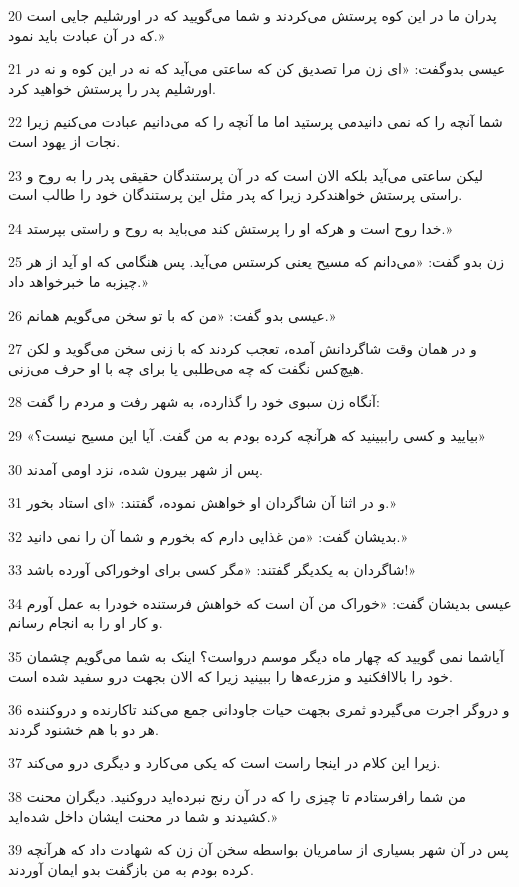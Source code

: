 \par 20 پدران ما در این کوه پرستش می‌کردند و شما می‌گویید که در اورشلیم جایی است که در آن عبادت باید نمود.»
\par 21 عیسی بدوگفت: «ای زن مرا تصدیق کن که ساعتی می‌آید که نه در این کوه و نه در اورشلیم پدر را پرستش خواهید کرد.
\par 22 شما آنچه را که نمی دانیدمی پرستید اما ما آنچه را که می‌دانیم عبادت می‌کنیم زیرا نجات از یهود است.
\par 23 لیکن ساعتی می‌آید بلکه الان است که در آن پرستندگان حقیقی پدر را به روح و راستی پرستش خواهندکرد زیرا که پدر مثل این پرستندگان خود را طالب است.
\par 24 خدا روح است و هر‌که او را پرستش کند می‌باید به روح و راستی بپرستد.»
\par 25 زن بدو گفت: «می‌دانم که مسیح یعنی کرستس می‌آید. پس هنگامی که او آید از هر چیزبه ما خبر‌خواهد داد.»
\par 26 عیسی بدو گفت: «من که با تو سخن می‌گویم همانم.»
\par 27 و در همان وقت شاگردانش آمده، تعجب کردند که با زنی سخن می‌گوید و لکن هیچ‌کس نگفت که چه می‌طلبی یا برای چه با او حرف می‌زنی.
\par 28 آنگاه زن سبوی خود را گذارده، به شهر رفت و مردم را گفت:
\par 29 «بیایید و کسی راببینید که هرآنچه کرده بودم به من گفت. آیا این مسیح نیست؟»
\par 30 پس از شهر بیرون شده، نزد اومی آمدند.
\par 31 و در اثنا آن شاگردان او خواهش نموده، گفتند: «ای استاد بخور.»
\par 32 بدیشان گفت: «من غذایی دارم که بخورم و شما آن را نمی دانید.»
\par 33 شاگردان به یکدیگر گفتند: «مگر کسی برای اوخوراکی آورده باشد!»
\par 34 عیسی بدیشان گفت: «خوراک من آن است که خواهش فرستنده خودرا به عمل آورم و کار او را به انجام رسانم.
\par 35 آیاشما نمی گویید که چهار ماه دیگر موسم درواست؟ اینک به شما می‌گویم چشمان خود را بالاافکنید و مزرعه‌ها را ببینید زیرا که الان بجهت درو سفید شده است.
\par 36 و دروگر اجرت می‌گیردو ثمری بجهت حیات جاودانی جمع می‌کند تاکارنده و درو‌کننده هر دو با هم خشنود گردند.
\par 37 زیرا این کلام در اینجا راست است که یکی می‌کارد و دیگری درو می‌کند.
\par 38 من شما رافرستادم تا چیزی را که در آن رنج نبرده‌اید دروکنید. دیگران محنت کشیدند و شما در محنت ایشان داخل شده‌اید.»
\par 39 پس در آن شهر بسیاری از سامریان بواسطه سخن آن زن که شهادت داد که هر‌آنچه کرده بودم به من باز‌گفت بدو ایمان آوردند.
